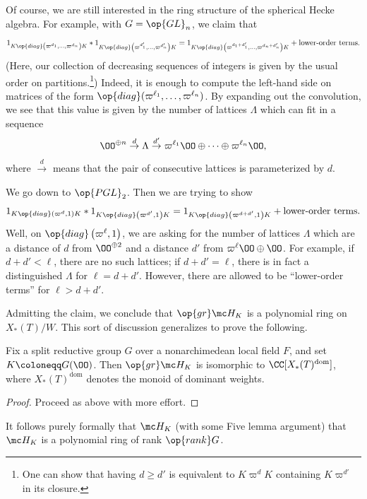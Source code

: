 \documentclass[../notes.tex]{subfiles}
\begin{document}
Of course, we are still interested in the ring structure of the spherical Hecke algebra. For example, with $G=\op{GL}_n$, we claim that
\[1_{K\op{diag}\left(\varpi^{d_1},\ldots,\varpi^{d_n}\right)K}*1_{K\op{diag}\left(\varpi^{d_1'},\ldots,\varpi^{d_n'}\right)K}=1_{K\op{diag}\left(\varpi^{d_1+d_1'},\ldots,\varpi^{d_n+d_n'}\right)K}+\text{lower-order terms}.\]
(Here, our collection of decreasing sequences of integers is given by the usual order on partitions.\footnote{One can show that having $d\ge d'$ is equivalent to $K\varpi^d K$ containing $K\varpi^{d'}$ in its closure.}) Indeed, it is enough to compute the left-hand side on matrices of the form $\op{diag}(\varpi^{\ell_1},\ldots,\varpi^{\ell_n})$. By expanding out the convolution, we see that this value is given by the number of lattices $\Lambda$ which can fit in a sequence
\[\OO^{\oplus n}\stackrel d\to\Lambda\stackrel{d'}\to\varpi^{\ell_1}\OO\oplus\cdots\oplus\varpi^{\ell_n}\OO,\]
where $\stackrel d\to$ means that the pair of consecutive lattices is parameterized by $d$.
\begin{example}
	We go down to $\op{PGL}_2$. Then we are trying to show
	\[1_{K\op{diag}\left(\varpi^d,1\right)K}*1_{K\op{diag}\left(\varpi^{d'},1\right)K}=1_{K\op{diag}\left(\varpi^{d+d'},1\right)K}+\text{lower-order terms}.\]
	Well, on $\op{diag}\left(\varpi^\ell,1\right)$, we are asking for the number of lattices $\Lambda$ which are a distance of $d$ from $\OO^{\oplus2}$ and a distance $d'$ from $\varpi^\ell\OO\oplus\OO$. For example, if $d+d'<\ell$, there are no such lattices; if $d+d'=\ell$, there is in fact a distinguished $\Lambda$ for $\ell=d+d'$. However, there are allowed to be ``lower-order terms'' for $\ell>d+d'$.
\end{example}
Admitting the claim, we conclude that $\op{gr}\mc H_K$ is a polynomial ring on $X_*(T)/W$. This sort of discussion generalizes to prove the following.
\begin{theorem}
	Fix a split reductive group $G$ over a nonarchimedean local field $F$, and set $K\coloneqq G(\OO)$. Then $\op{gr}\mc H_K$ is isomorphic to $\CC[X_*(T)^{\mathrm{dom}}]$, where $X_*(T)^{\mathrm{dom}}$ denotes the monoid of dominant weights.
\end{theorem}
\begin{proof}
	Proceed as above with more effort.
\end{proof}
\begin{remark}
	It follows purely formally that $\mc H_K$ (with some Five lemma argument) that $\mc H_K$ is a polynomial ring of rank $\op{rank}G$.
\end{remark}
\end{document}
